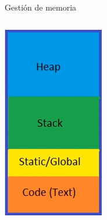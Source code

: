 \documentclass[aspectratio=169,presentation]{beamer}
\begin{document}
\begin{frame}[label={sec:org711ae77},fragile]{Gestión de memoria}
\begin{columns}
\begin{column}{0.28\columnwidth}
\begin{center}
\includegraphics[width=.9\linewidth]{./img/heap-stack-color.png}
\end{center}
\end{column}
\end{columns}
\end{frame}
\end{document}
